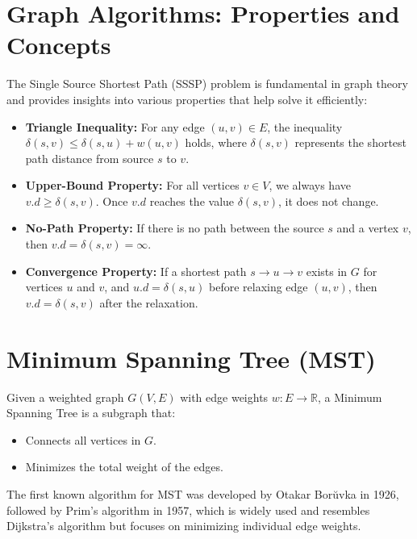 \section{Graph Algorithms: Properties and Concepts}


The Single Source Shortest Path (SSSP) problem is fundamental in graph theory and provides insights into various properties that help solve it efficiently:

\begin{itemize}
    \item \textbf{Triangle Inequality:} For any edge $(u,v) \in E$, the inequality \( \delta(s,v) \leq \delta(s,u) + w(u,v) \) holds, where \( \delta(s,v) \) represents the shortest path distance from source \( s \) to \( v \).
    
    \item \textbf{Upper-Bound Property:} For all vertices \( v \in V \), we always have \( v.d \geq \delta(s,v) \). Once \( v.d \) reaches the value \( \delta(s,v) \), it does not change.

    \item \textbf{No-Path Property:} If there is no path between the source \( s \) and a vertex \( v \), then \( v.d = \delta(s,v) = \infty \).

    \item \textbf{Convergence Property:} If a shortest path \( s \to u \to v \) exists in \( G \) for vertices \( u \) and \( v \), and \( u.d = \delta(s,u) \) before relaxing edge \( (u,v) \), then \( v.d = \delta(s,v) \) after the relaxation.
\end{itemize}

\section{Minimum Spanning Tree (MST)}

Given a weighted graph \( G(V, E) \) with edge weights \( w: E \to \mathbb{R} \), a Minimum Spanning Tree is a subgraph that:
\begin{itemize}
    \item Connects all vertices in \( G \).
    \item Minimizes the total weight of the edges.
\end{itemize}

The first known algorithm for MST was developed by Otakar Bor\u{u}vka in 1926, followed by Prim's algorithm in 1957, which is widely used and resembles Dijkstra's algorithm but focuses on minimizing individual edge weights.

